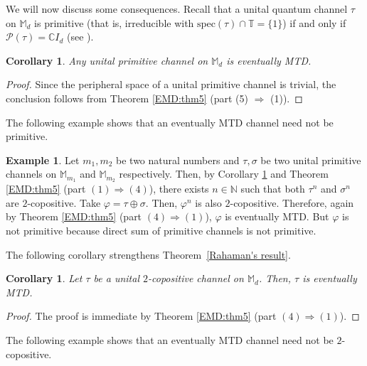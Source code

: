 \documentclass[11pt,reqno]{amsart}
\theoremstyle{definition}
\newtheorem{eg}[defn]{Example}
\theoremstyle{plain}
\newtheorem{cor}[defn]{Corollary}
\theoremstyle{remark}
\numberwithin{equation}{section}%
\begin{document}
We will now discuss some consequences. Recall that a unital quantum channel $\tau$ on $\mathbb{M}_d$ is primitive (that is, irreducible with $\mathrm{spec}(\tau) \cap \mathbb{T} = \{1\}$) if and only if $\mathcal{P}(\tau) = \mathbb{C}I_d$ (see \cite{BKT, MR}).


\begin{cor}\label{primitive}
	Any unital primitive channel on $\mathbb{M}_d$ is eventually MTD.
\end{cor}


\begin{proof}
	Since the peripheral space of a unital primitive channel is trivial, the conclusion follows from Theorem \ref{EMD:thm5} (part (5) $\Rightarrow$ (1)).
\end{proof}






The following example shows that an eventually MTD channel need not be primitive.


\begin{eg}\label{EMD:eg2}
	Let $m_1, m_2$ be two natural numbers and $\tau,\sigma$ be two unital primitive channels on $\mathbb{M}_{m_1}$ and $\mathbb{M}_{m_2}$ respectively. Then, by Corollary \ref{primitive} and Theorem \ref{EMD:thm5} (part $(1) \Rightarrow (4)$), there exists $n\in\mathbb{N}$ such that both $\tau^n$ and $\sigma^n$ are $2$-copositive. Take $\varphi=\tau\oplus \sigma$. Then, $\varphi^{n}$ is also $2$-copositive. Therefore, again by Theorem \ref{EMD:thm5} (part $(4) \Rightarrow (1)$), $\varphi$ is eventually MTD. But $\varphi$ is not primitive because direct sum of primitive channels is not primitive.
\end{eg}






The following corollary strengthens Theorem~\ref{Rahaman's result}.



\begin{cor}
	Let $\tau$ be a unital $2$-copositive channel on $\mathbb{M}_d$. Then, $\tau$ is eventually MTD.
\end{cor}


\begin{proof}
	The proof is immediate by Theorem \ref{EMD:thm5} (part $(4)\Rightarrow (1)$).
\end{proof}



The following example shows that an eventually MTD channel need not be $2$-copositive.
\end{document}
